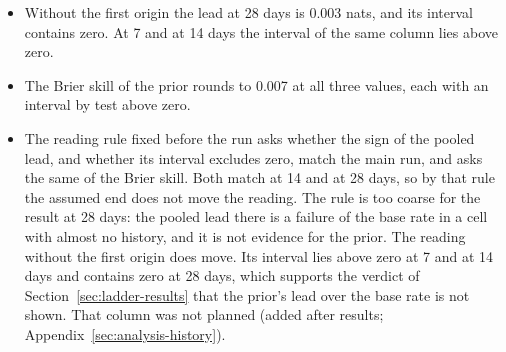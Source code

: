 \begin{itemize}
\item Without the first origin the lead at 28 days is 0.003 nats, and its interval contains zero. At 7 and at 14 days the interval of the same column lies above zero.
\item The Brier skill of the prior rounds to 0.007 at all three values, each with an interval by test above zero.
\item The reading rule fixed before the run asks whether the sign of the pooled lead, and whether its interval excludes zero, match the main run, and asks the same of the Brier skill. Both match at 14 and at 28 days, so by that rule the assumed end does not move the reading. The rule is too coarse for the result at 28 days: the pooled lead there is a failure of the base rate in a cell with almost no history, and it is not evidence for the prior. The reading without the first origin does move. Its interval lies above zero at 7 and at 14 days and contains zero at 28 days, which supports the verdict of Section~\ref{sec:ladder-results} that the prior's lead over the base rate is not shown. That column was not planned (added after results; Appendix~\ref{sec:analysis-history}).
\end{itemize}

